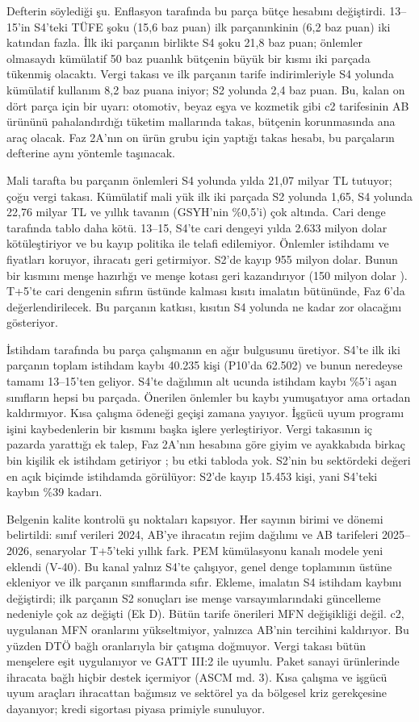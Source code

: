 Defterin söylediği şu. Enflasyon tarafında bu parça bütçe hesabını değiştirdi. 13--15'in S4'teki TÜFE şoku (15,6 baz puan) ilk parçanınkinin (6,2 baz puan) iki katından fazla. İlk iki parçanın birlikte S4 şoku 21,8 baz puan; önlemler olmasaydı kümülatif 50 baz puanlık bütçenin büyük bir kısmı iki parçada tükenmiş olacaktı. Vergi takası ve ilk parçanın tarife indirimleriyle S4 yolunda kümülatif kullanım 8,2 baz puana iniyor; S2 yolunda 2,4 baz puan. Bu, kalan on dört parça için bir uyarı: otomotiv, beyaz eşya ve kozmetik gibi c2 tarifesinin AB ürününü pahalandırdığı tüketim mallarında takas, bütçenin korunmasında ana araç olacak. Faz 2A'nın on ürün grubu için yaptığı takas hesabı, bu parçaların defterine aynı yöntemle taşınacak.

Mali tarafta bu parçanın önlemleri S4 yolunda yılda 21,07 milyar TL tutuyor; çoğu vergi takası. Kümülatif mali yük ilk iki parçada S2 yolunda 1,65, S4 yolunda 22,76 milyar TL ve yıllık tavanın (GSYH'nin \%0,5'i) çok altında. Cari denge tarafında tablo daha kötü. 13--15, S4'te cari dengeyi yılda 2.633 milyon dolar kötüleştiriyor ve bu kayıp politika ile telafi edilemiyor. Önlemler istihdamı ve fiyatları koruyor, ihracatı geri getirmiyor. S2'de kayıp 955 milyon dolar. Bunun bir kısmını menşe hazırlığı ve menşe kotası geri kazandırıyor (150 milyon dolar \etiketH{}). T+5'te cari dengenin sıfırın üstünde kalması kısıtı imalatın bütününde, Faz 6'da değerlendirilecek. Bu parçanın katkısı, kısıtın S4 yolunda ne kadar zor olacağını gösteriyor.

İstihdam tarafında bu parça çalışmanın en ağır bulgusunu üretiyor. S4'te ilk iki parçanın toplam istihdam kaybı 40.235 kişi (P10'da 62.502) ve bunun neredeyse tamamı 13--15'ten geliyor. S4'te dağılımın alt ucunda istihdam kaybı \%5'i aşan sınıfların hepsi bu parçada. Önerilen önlemler bu kaybı yumuşatıyor ama ortadan kaldırmıyor. Kısa çalışma ödeneği geçişi zamana yayıyor. İşgücü uyum programı işini kaybedenlerin bir kısmını başka işlere yerleştiriyor. Vergi takasının iç pazarda yarattığı ek talep, Faz 2A'nın hesabına göre giyim ve ayakkabıda birkaç bin kişilik ek istihdam getiriyor \etiketT{}; bu etki tabloda yok. S2'nin bu sektördeki değeri en açık biçimde istihdamda görülüyor: S2'de kayıp 15.453 kişi, yani S4'teki kaybın \%39 kadarı.

Belgenin kalite kontrolü şu noktaları kapsıyor. Her sayının birimi ve dönemi belirtildi: sınıf verileri 2024, AB'ye ihracatın rejim dağılımı ve AB tarifeleri 2025--2026, senaryolar T+5'teki yıllık fark. PEM kümülasyonu kanalı modele yeni eklendi (V-40). Bu kanal yalnız S4'te çalışıyor, genel denge toplamının üstüne ekleniyor ve ilk parçanın sınıflarında sıfır. Ekleme, imalatın S4 istihdam kaybını değiştirdi; ilk parçanın S2 sonuçları ise menşe varsayımlarındaki güncelleme nedeniyle çok az değişti (Ek D). Bütün tarife önerileri MFN değişikliği değil. c2, uygulanan MFN oranlarını yükseltmiyor, yalnızca AB'nin tercihini kaldırıyor. Bu yüzden DTÖ bağlı oranlarıyla bir çatışma doğmuyor. Vergi takası bütün menşelere eşit uygulanıyor ve GATT III:2 ile uyumlu. Paket sanayi ürünlerinde ihracata bağlı hiçbir destek içermiyor (ASCM md. 3). Kısa çalışma ve işgücü uyum araçları ihracattan bağımsız ve sektörel ya da bölgesel kriz gerekçesine dayanıyor; kredi sigortası piyasa primiyle sunuluyor.

